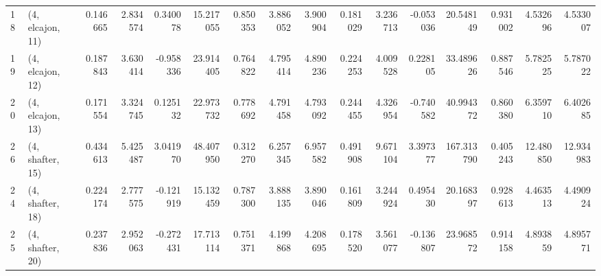 \begin{tabular}{llrrrrrrrrrrrrrr}
18 &  (4, elcajon, 11) &   0.146665 &  2.834574 &  0.340078 &  15.217055 &  0.850353 &   3.886052 &  3.900904 &  0.181029 &   3.236713 & -0.053036 &   20.548149 &  0.931002 &   4.532696 &   4.533007 \\
19 &  (4, elcajon, 12) &   0.187843 &  3.630414 & -0.958336 &  23.914405 &  0.764822 &   4.795414 &  4.890236 &  0.224253 &   4.009528 &  0.228105 &   33.489626 &  0.887546 &   5.782525 &   5.787022 \\
20 &  (4, elcajon, 13) &   0.171554 &  3.324745 &  0.125132 &  22.973732 &  0.778692 &   4.791458 &  4.793092 &  0.244455 &   4.326954 & -0.740582 &   40.994372 &  0.860380 &   6.359710 &   6.402685 \\
26 &  (4, shafter, 15) &   0.434613 &  5.425487 &  3.041970 &  48.407950 &  0.312270 &   6.257345 &  6.957582 &  0.491908 &   9.671104 &  3.397377 &  167.313790 &  0.405243 &  12.480850 &  12.934983 \\
24 &  (4, shafter, 18) &   0.224174 &  2.777575 & -0.121919 &  15.132459 &  0.787300 &   3.888135 &  3.890046 &  0.161809 &   3.244924 &  0.495430 &   20.168397 &  0.928613 &   4.463513 &   4.490924 \\
25 &  (4, shafter, 20) &   0.237836 &  2.952063 & -0.272431 &  17.713114 &  0.751371 &   4.199868 &  4.208695 &  0.178520 &   3.561077 & -0.136807 &   23.968572 &  0.914158 &   4.893859 &   4.895771 \\
\bottomrule
\end{tabular}
